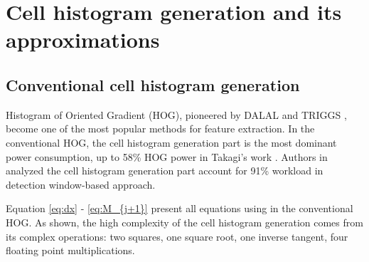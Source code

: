%
%

\section{Cell histogram generation and its approximations} 
\label{sec:conventional_non_normalize_feature_extraction_in_hog}

\subsection{Conventional cell histogram generation}
\label{sub:conventional_hog}

Histogram of Oriented Gradient (HOG), pioneered by DALAL and
TRIGGS \cite{dalal2005hog},
become one of the most popular methods for feature extraction.
In the conventional HOG, the cell histogram generation part is the most dominant
power consumption, up to 58\% HOG power in Takagi's work \cite{takagi2013sdh}.
Authors in \cite{mizuno2012ash} analyzed the cell histogram generation part account for 91\%
workload in detection window-based approach.

Equation \ref{eq:dx} - \ref{eq:M_{j+1}} present all equations using in the conventional HOG.
As shown, the high complexity of the cell histogram generation comes
from its complex operations: two squares, one square root, one inverse tangent, four floating
point multiplications.

